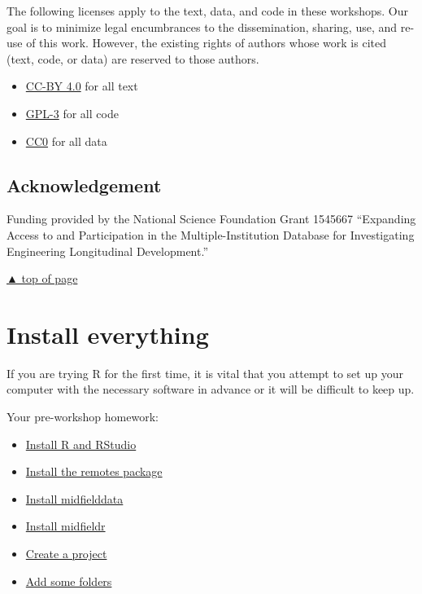 \documentclass[
]{book}
\providecommand{\tightlist}{%
  \setlength{\itemsep}{0pt}\setlength{\parskip}{0pt}}
\begin{document}
The following licenses apply to the text, data, and code in these workshops. Our goal is to minimize legal encumbrances to the dissemination, sharing, use, and re-use of this work. However, the existing rights of authors whose work is cited (text, code, or data) are reserved to those authors.

\begin{itemize}
\tightlist
\item
  \href{https://creativecommons.org/licenses/by/4.0/legalcode}{CC-BY 4.0} for all text\\
\item
  \href{https://www.r-project.org/Licenses/GPL-3}{GPL-3} for all code\\
\item
  \href{https://wiki.creativecommons.org/wiki/CC0_use_for_data}{CC0} for all data
\end{itemize}

\hypertarget{acknowledgement}{%
\section*{Acknowledgement}\label{acknowledgement}}

Funding provided by the National Science Foundation Grant 1545667 ``Expanding Access to and Participation in the Multiple-Institution Database for Investigating Engineering Longitudinal Development.''

\protect\hyperlink{introduction}{▲ top of page}

\hypertarget{install-everything}{%
\chapter{Install everything}\label{install-everything}}

If you are trying R for the first time, it is vital that you attempt to set up your computer with the necessary software in advance or it will be difficult to keep up.

Your pre-workshop homework:

\begin{itemize}
\tightlist
\item
  \protect\hyperlink{install-r-and-rstudio}{Install R and RStudio}
\item
  \protect\hyperlink{install-the-remotes-package}{Install the remotes package}
\item
  \protect\hyperlink{install-midfielddata}{Install midfielddata}
\item
  \protect\hyperlink{install-midfieldr}{Install midfieldr}
\item
  \protect\hyperlink{create-a-project}{Create a project}\\
\item
  \protect\hyperlink{add-some-folders}{Add some folders}
\end{itemize}
\end{document}
